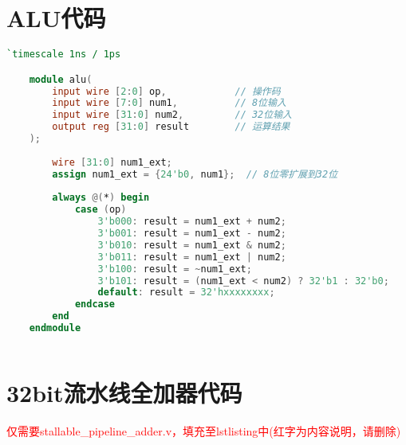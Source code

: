 \appendix
\section{ALU代码}

\begin{lstlisting}[language=Verilog]
    `timescale 1ns / 1ps

    module alu(
        input wire [2:0] op,            // 操作码
        input wire [7:0] num1,          // 8位输入
        input wire [31:0] num2,         // 32位输入
        output reg [31:0] result        // 运算结果
    );
    
        wire [31:0] num1_ext;
        assign num1_ext = {24'b0, num1};  // 8位零扩展到32位
    
        always @(*) begin
            case (op)
                3'b000: result = num1_ext + num2;
                3'b001: result = num1_ext - num2;
                3'b010: result = num1_ext & num2;
                3'b011: result = num1_ext | num2;
                3'b100: result = ~num1_ext;
                3'b101: result = (num1_ext < num2) ? 32'b1 : 32'b0;
                default: result = 32'hxxxxxxxx;
            endcase
        end
    endmodule
    
\end{lstlisting}

\section{32bit流水线全加器代码}
\textcolor{red}{仅需要stallable\_pipeline\_adder.v，填充至lstlisting中(红字为内容说明，请删除)}
\begin{lstlisting}[language=Verilog]

\end{lstlisting}


